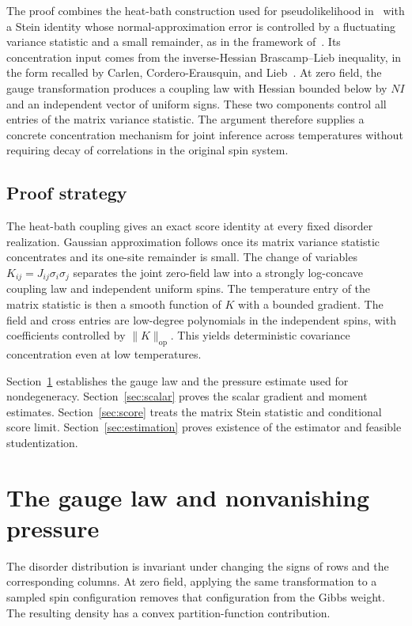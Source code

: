 \documentclass[11pt]{amsart}
\numberwithin{equation}{section}
\theoremstyle{remark}
\newcommand{\op}{\mathrm{op}}
\begin{document}
The proof combines the heat-bath construction used for pseudolikelihood in~\cite{Chatterjee2007} with a Stein identity whose normal-approximation error is controlled by a fluctuating variance statistic and a small remainder, as in the framework of~\cite{Chatterjee2008}. Its concentration input comes from the inverse-Hessian Brascamp--Lieb inequality, in the form recalled by Carlen, Cordero-Erausquin, and Lieb~\cite[(1.3)]{Carlen2011}. At zero field, the gauge transformation produces a coupling law with Hessian bounded below by $NI$ and an independent vector of uniform signs. These two components control all entries of the matrix variance statistic. The argument therefore supplies a concrete concentration mechanism for joint inference across temperatures without requiring decay of correlations in the original spin system.

\subsection{Proof strategy}
The heat-bath coupling gives an exact score identity at every fixed disorder realization. Gaussian approximation follows once its matrix variance statistic concentrates and its one-site remainder is small. The change of variables $K_{ij}=J_{ij}\sigma_i\sigma_j$ separates the joint zero-field law into a strongly log-concave coupling law and independent uniform spins. The temperature entry of the matrix statistic is then a smooth function of $K$ with a bounded gradient. The field and cross entries are low-degree polynomials in the independent spins, with coefficients controlled by $\|K\|_\op$. This yields deterministic covariance concentration even at low temperatures.

Section~\ref{sec:gauge} establishes the gauge law and the pressure estimate used for nondegeneracy. Section~\ref{sec:scalar} proves the scalar gradient and moment estimates. Section~\ref{sec:score} treats the matrix Stein statistic and conditional score limit. Section~\ref{sec:estimation} proves existence of the estimator and feasible studentization.

\section{The gauge law and nonvanishing pressure}\label{sec:gauge}

The disorder distribution is invariant under changing the signs of rows and the corresponding columns. At zero field, applying the same transformation to a sampled spin configuration removes that configuration from the Gibbs weight. The resulting density has a convex partition-function contribution.
\end{document}
